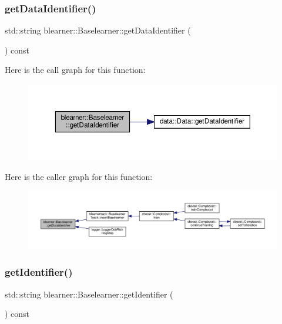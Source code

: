 \subsubsection{\texorpdfstring{get\+Data\+Identifier()}{getDataIdentifier()}}
{\footnotesize\ttfamily std\+::string blearner\+::\+Baselearner\+::get\+Data\+Identifier (\begin{DoxyParamCaption}{ }\end{DoxyParamCaption}) const}

Here is the call graph for this function\+:
\nopagebreak
\begin{figure}[H]
\begin{center}
\leavevmode
\includegraphics[width=350pt]{classblearner_1_1_baselearner_a2393dc1e3cf90919ebbbd237fe303860_cgraph}
\end{center}
\end{figure}
Here is the caller graph for this function\+:
\nopagebreak
\begin{figure}[H]
\begin{center}
\leavevmode
\includegraphics[width=350pt]{classblearner_1_1_baselearner_a2393dc1e3cf90919ebbbd237fe303860_icgraph}
\end{center}
\end{figure}
\mbox{\label{classblearner_1_1_baselearner_aa10fa4301aeb37f6e8c18457541c3be7}} 
\subsubsection{\texorpdfstring{get\+Identifier()}{getIdentifier()}}
{\footnotesize\ttfamily std\+::string blearner\+::\+Baselearner\+::get\+Identifier (\begin{DoxyParamCaption}{ }\end{DoxyParamCaption}) const}

